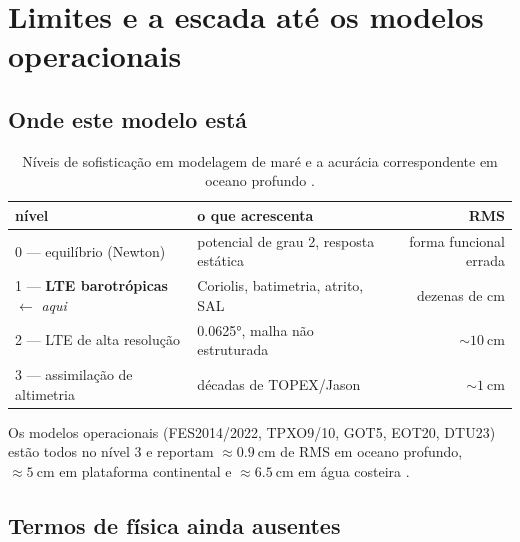 \documentclass[11pt,a4paper,oneside]{report}
\theoremstyle{definition}
\theoremstyle{plain}
\theoremstyle{remark}
\begin{document}
\chapter{Limites e a escada até os modelos operacionais}
\label{cap:limites}

\section{Onde este modelo está}

\begin{table}[htbp]
\centering
\caption{Níveis de sofisticação em modelagem de maré e a acurácia
correspondente em oceano profundo \cite{stammer2014}.}
\label{tab:escada}
\small
\begin{tabular}{@{}p{4.3cm}p{5.6cm}r@{}}
\toprule
nível & o que acrescenta & RMS \\
\midrule
0 --- equilíbrio (Newton) & potencial de grau 2, resposta estática & forma funcional errada \\
1 --- \textbf{LTE barotrópicas} $\leftarrow$ \emph{aqui} & Coriolis, batimetria, atrito, SAL & dezenas de cm \\
2 --- LTE de alta resolução & \ang{0.0625}, malha não estruturada & $\sim\SI{10}{\centi\meter}$ \\
3 --- assimilação de altimetria & décadas de TOPEX/Jason & $\sim\SI{1}{\centi\meter}$ \\
\bottomrule
\end{tabular}
\end{table}

Os modelos operacionais (FES2014/2022, TPXO9/10, GOT5, EOT20, DTU23) estão
todos no nível 3 e reportam $\approx\SI{0.9}{\centi\meter}$ de RMS em oceano
profundo, $\approx\SI{5}{\centi\meter}$ em plataforma continental e
$\approx\SI{6.5}{\centi\meter}$ em água costeira \cite{stammer2014,lyard2021}.

\section{Termos de física ainda ausentes}
\end{document}
